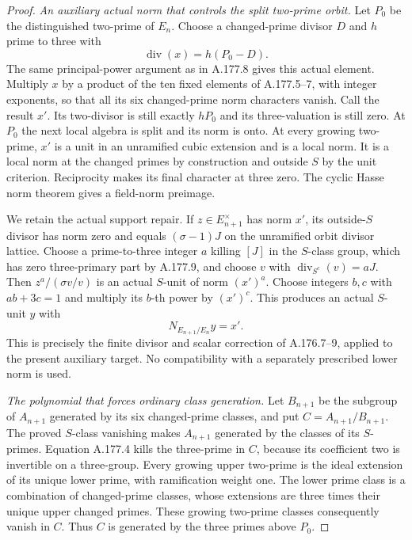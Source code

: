 \begin{proof}
\emph{An auxiliary actual norm that controls the split two-prime orbit.}
Let $P_0$ be the distinguished two-prime of $E_n$.
Choose a changed-prime divisor $D$ and $h$ prime to three with
\[
                         \operatorname{div}(x)=h(P_0-D).
\tag{A.177.10}
\]
The same principal-power argument as in A.177.8 gives this actual
element.  Multiply $x$ by a product of the ten fixed elements
of A.177.5--7, with integer exponents, so that all its six
changed-prime norm characters vanish.  Call the result $x'$.
Its two-divisor is still exactly $hP_0$ and its three-valuation
is still zero.
At $P_0$ the next local algebra is split and its norm is onto.
At every growing two-prime, $x'$ is a unit in an unramified
cubic extension and is a local norm.  It is a local norm at
the changed primes by construction and outside $S$ by the unit
criterion.  Reciprocity makes its final character at three zero.
The cyclic Hasse norm theorem gives a field-norm preimage.

We retain the actual support repair.  If $z\in E_{n+1}^\times$
has norm $x'$, its outside-$S$ divisor has norm zero and equals
$(\sigma-1)J$ on the unramified orbit divisor lattice.
Choose a prime-to-three integer $a$ killing $[J]$ in the
$S$-class group, which has zero three-primary part by A.177.9,
and choose $v$ with $\operatorname{div}_{S^c}(v)=aJ$.
Then $z^a/(\sigma v/v)$ is an actual $S$-unit of norm $(x')^a$.
Choose integers $b,c$ with $ab+3c=1$ and multiply its $b$-th
power by $(x')^c$.  This produces an actual $S$-unit $y$ with
\[
                             N_{E_{n+1}/E_n}y=x'.
\tag{A.177.11}
\]
This is precisely the finite divisor and scalar correction of
A.176.7--9, applied to the present auxiliary target.
No compatibility with a separately prescribed lower norm is used.

\emph{The polynomial that forces ordinary class generation.}
Let $B_{n+1}$ be the subgroup of $A_{n+1}$ generated by its six
changed-prime classes, and put $C=A_{n+1}/B_{n+1}$.
The proved $S$-class vanishing makes $A_{n+1}$ generated by the
classes of its $S$-primes.
Equation A.177.4 kills the three-prime in $C$, because its
coefficient two is invertible on a three-group.
Every growing upper two-prime is the ideal extension of its
unique lower prime, with ramification weight one.  The lower
prime class is a combination of changed-prime classes, whose
extensions are three times their unique upper changed primes.
These growing two-prime classes consequently vanish in $C$.
Thus $C$ is generated by the three primes above $P_0$.


\end{proof}

